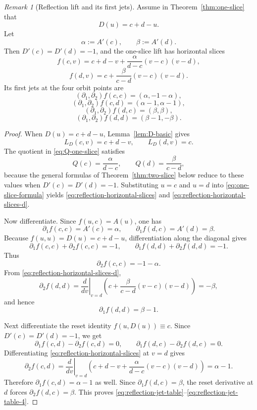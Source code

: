 \documentclass[11pt]{amsart}
\numberwithin{equation}{section}
\theoremstyle{remark}
\newtheorem{remark}[theorem]{Remark}
\theoremstyle{definition}
\begin{document}
\begin{remark}[Reflection lift and its first jets]\label{rem:reflection-jets}
Assume in Theorem~\ref{thm:one-slice} that
\[
D(u)=c+d-u.
\]
Let
\[
\alpha:=A'(c),\qquad \beta:=A'(d).
\]
Then $D'(c)=D'(d)=-1$, and the one-slice lift has horizontal slices
\begin{equation}\label{eq:reflection-horizontal-slices}
f(c,v)=c+d-v+\frac{\alpha}{d-c}(v-c)(v-d),
\end{equation}
\begin{equation}\label{eq:reflection-horizontal-slices-d}
f(d,v)=c+\frac{\beta}{c-d}(v-c)(v-d).
\end{equation}
Its first jets at the four orbit points are
\begin{equation}\label{eq:reflection-jet-table}
(\partial_1,\partial_2)f(c,c)=(\alpha,-1-\alpha),
\end{equation}
\begin{equation}\label{eq:reflection-jet-table-2}
(\partial_1,\partial_2)f(c,d)=(\alpha-1,\alpha-1),
\end{equation}
\begin{equation}\label{eq:reflection-jet-table-3}
(\partial_1,\partial_2)f(d,c)=(\beta,\beta),
\end{equation}
\begin{equation}\label{eq:reflection-jet-table-4}
(\partial_1,\partial_2)f(d,d)=(\beta-1,-\beta).
\end{equation}
\end{remark}

\begin{proof}
When $D(u)=c+d-u$, Lemma~\ref{lem:D-basic} gives
\[
L_D(c,v)=c+d-v,\qquad L_D(d,v)=c.
\]
The quotient in \eqref{eq:Q-one-slice} satisfies
\[
Q(c)=\frac{\alpha}{d-c},\qquad Q(d)=\frac{\beta}{c-d},
\]
because the general formulas of Theorem~\ref{thm:two-slice} below reduce to these values when $D'(c)=D'(d)=-1$. Substituting $u=c$ and $u=d$ into \eqref{eq:one-slice-formula} yields \eqref{eq:reflection-horizontal-slices} and \eqref{eq:reflection-horizontal-slices-d}.

Now differentiate. Since $f(u,c)=A(u)$, one has
\[
\partial_1 f(c,c)=A'(c)=\alpha,
\qquad
\partial_1 f(d,c)=A'(d)=\beta.
\]
Because $f(u,u)=D(u)=c+d-u$, differentiation along the diagonal gives
\[
\partial_1 f(c,c)+\partial_2 f(c,c)=-1,
\qquad
\partial_1 f(d,d)+\partial_2 f(d,d)=-1.
\]
Thus
\[
\partial_2 f(c,c)=-1-\alpha.
\]
From \eqref{eq:reflection-horizontal-slices-d},
\[
\partial_2 f(d,d)=\left.\frac{d}{dv}\right|_{v=d}\left(c+\frac{\beta}{c-d}(v-c)(v-d)\right)=-\beta,
\]
and hence
\[
\partial_1 f(d,d)=\beta-1.
\]

Next differentiate the reset identity $f(u,D(u))\equiv c$. Since $D'(c)=D'(d)=-1$, we get
\[
\partial_1 f(c,d)-\partial_2 f(c,d)=0,
\qquad
\partial_1 f(d,c)-\partial_2 f(d,c)=0.
\]
Differentiating \eqref{eq:reflection-horizontal-slices} at $v=d$ gives
\[
\partial_2 f(c,d)=\left.\frac{d}{dv}\right|_{v=d}\left(c+d-v+\frac{\alpha}{d-c}(v-c)(v-d)\right)=\alpha-1.
\]
Therefore $\partial_1 f(c,d)=\alpha-1$ as well. Since $\partial_1 f(d,c)=\beta$, the reset derivative at $d$ forces $\partial_2 f(d,c)=\beta$. This proves \eqref{eq:reflection-jet-table}--\eqref{eq:reflection-jet-table-4}.
\end{proof}
\end{document}
